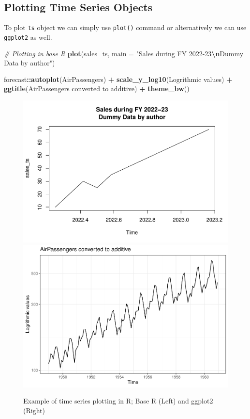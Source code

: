 \documentclass[
]{book}
\newenvironment{Shaded}{\begin{snugshade}}{\end{snugshade}}
\newcommand{\AttributeTok}[1]{\textcolor[rgb]{0.13,0.29,0.53}{#1}}
\newcommand{\CommentTok}[1]{\textcolor[rgb]{0.56,0.35,0.01}{\textit{#1}}}
\newcommand{\FunctionTok}[1]{\textcolor[rgb]{0.13,0.29,0.53}{\textbf{#1}}}
\newcommand{\NormalTok}[1]{#1}
\newcommand{\SpecialCharTok}[1]{\textcolor[rgb]{0.81,0.36,0.00}{\textbf{#1}}}
\newcommand{\StringTok}[1]{\textcolor[rgb]{0.31,0.60,0.02}{#1}}
\begin{document}
\hypertarget{plotting-time-series-objects}{%
\subsection{Plotting Time Series Objects}\label{plotting-time-series-objects}}

To plot \texttt{ts} object we can simply use \texttt{plot()} command or alternatively we can use \texttt{ggplot2} as well.

\begin{Shaded}
\begin{Highlighting}[]
\CommentTok{\# Plotting in base R}
\FunctionTok{plot}\NormalTok{(sales\_ts, }\AttributeTok{main =} \StringTok{"Sales during FY 2022{-}23}\SpecialCharTok{\textbackslash{}n}\StringTok{Dummy Data by author"}\NormalTok{)}

\NormalTok{forecast}\SpecialCharTok{::}\FunctionTok{autoplot}\NormalTok{(AirPassengers) }\SpecialCharTok{+}
  \FunctionTok{scale\_y\_log10}\NormalTok{(}\StringTok{\textquotesingle{}Logrithmic values\textquotesingle{}}\NormalTok{) }\SpecialCharTok{+}
  \FunctionTok{ggtitle}\NormalTok{(}\StringTok{\textquotesingle{}AirPassengers converted to additive\textquotesingle{}}\NormalTok{) }\SpecialCharTok{+}
  \FunctionTok{theme\_bw}\NormalTok{()}
\end{Highlighting}
\end{Shaded}

\begin{figure}

{\centering \includegraphics[width=0.48\linewidth]{DauR_files/figure-latex/tsex2-1} \includegraphics[width=0.48\linewidth]{DauR_files/figure-latex/tsex2-2} 

}

\caption{Example of time series plotting in R; Base R (Left) and ggplot2 (Right)}\label{fig:tsex2}
\end{figure}
\end{document}
